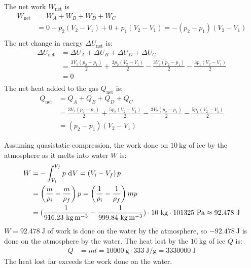 \documentclass{article}
\begin{document}
The net work $W_{\text{net}}$ is
\begin{equation}
    \begin{split}
        W_{\text{net}} & = W_A + W_B + W_D + W_C \\
        & = 0 - p_2\left(V_2 - V_1\right) + 0 + p_1\left(V_2 - V_1\right) = -\left(p_2 - p_1\right)\left(V_2 - V_1\right) \\
    \end{split}
\end{equation}
The net change in energy $\Delta U_{\text{net}}$ is:
\begin{equation}
    \begin{split}
        \Delta U_{\text{net}} & = \Delta U_A + \Delta U_B + \Delta U_D + \Delta U_C \\
        & = \frac{3V_1\left(p_2 - p_1\right)}{2} + \frac{3p_2\left(V_2 - V_1\right)}{2} - \frac{3V_2\left(p_2 - p_1\right)}{2} - \frac{3p_1\left(V_2 - V_1\right)}{2} \\
        & = 0 \\
    \end{split}
\end{equation}
The net heat added to the gas $Q_{\text{net}}$ is:
\begin{equation}
    \begin{split}
        Q_{\text{net}} & = Q_A + Q_B + Q_D + Q_C \\
        & = \frac{3V_1\left(p_2 - p_1\right)}{2} + \frac{5p_2\left(V_2 - V_1\right)}{2} - \frac{3V_2\left(p_2 - p_1\right)}{2} - \frac{5p_1\left(V_2 - V_1\right)}{2} \\
        & = \left(p_2 - p_1\right)\left(V_2 - V_1\right)
    \end{split}
\end{equation}
\clearpage

\problem
{}
Assuming quasistatic compression, the work done on $10~\unit{\kilo\gram}$ of ice by the atmosphere as it melts into water $W$ is:
\begin{equation}
    \begin{split}
        W & = -\int_{V_i}^{V_f} p \, \diff{V} = \left(V_i - V_f\right)p \\
        & = \left(\frac{m}{\rho_i} - \frac{m}{\rho_f}\right)p = \left(\frac{1}{\rho_i} - \frac{1}{\rho_f}\right)mp \\
        & = (\frac{1}{916.23~\unit{\kilo\gram\per\meter\cubed}} - \frac{1}{999.84~\unit{\kilo\gram\per\meter\cubed}}) \cdot 10~\unit{\kilo\gram}\cdot 101325~\unit{\pascal}\approx 92.478~\unit{\joule}
    \end{split}
\end{equation}
$W = 92.478~\unit{\joule}$ of work is done on the water by the atmosphere, so $-92.478~\unit{\joule}$ is done on the atmosphere by the water.
The heat lost by the $10~\unit{\kilo\gram}$ of ice $Q$ is:
\begin{equation}
    \begin{split}
        Q & = ml = 10000~\unit{\gram} \cdot 333~\unit{\joule\per\gram} = 3330000~\unit{\joule}
    \end{split}
\end{equation}
The heat lost far exceeds the work done on the water.
\end{document}
